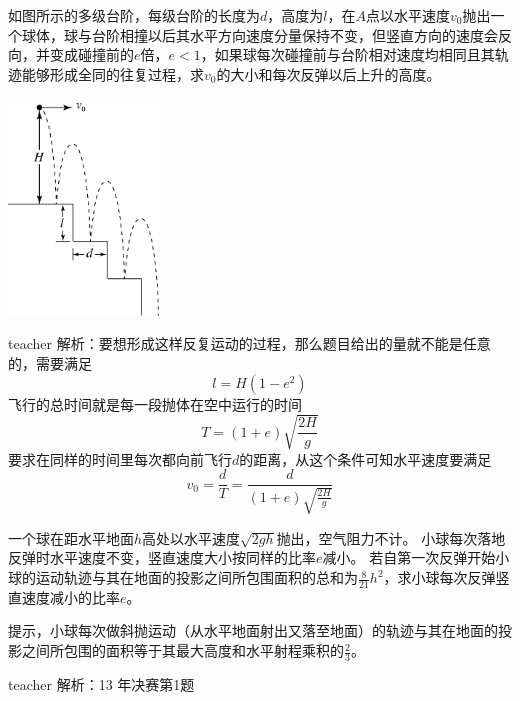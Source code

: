 \begin{example}
如图所示的多级台阶，每级台阶的长度为$d$，高度为$l$，在$A$点以水平速度$v_0$抛出一个球体，球与台阶相撞以后其水平方向速度分量保持不变，但竖直方向的速度会反向，并变成碰撞前的$e$倍，$e<1$，如果球每次碰撞前与台阶相对速度均相同且其轨迹能够形成全同的往复过程，求$v_0$的大小和每次反弹以后上升的高度。
\begin{flushright}
\includegraphics[width=0.3\textwidth]{images/motion-problem-30.pdf}
\end{flushright}
\begin{taggedblock}{teacher}
\noindent
解析：要想形成这样反复运动的过程，那么题目给出的量就不能是任意的，需要满足
\[
l = H(1-e^2)
\]
飞行的总时间就是每一段抛体在空中运行的时间
\[
T = (1+e)\sqrt{\frac{2H}{g}}
\]
要求在同样的时间里每次都向前飞行$d$的距离，从这个条件可知水平速度要满足
\[
v_0 = \frac{d}{T} = \frac{d}{(1+e)\sqrt{\frac{2H}{g}}}
\]
\end{taggedblock}
\end{example}



\begin{example}
一个球在距水平地面$h$高处以水平速度$\sqrt{2gh}$抛出，空气阻力不计。
小球每次落地反弹时水平速度不变，竖直速度大小按同样的比率$e$减小。
若自第一次反弹开始小球的运动轨迹与其在地面的投影之间所包围面积的总和为$\frac{8}{21}h^2$，求小球每次反弹竖直速度减小的比率$e$。

提示，小球每次做斜抛运动（从水平地面射出又落至地面）的轨迹与其在地面的投影之间所包围的面积等于其最大高度和水平射程乘积的$\frac{2}{3}$。
\begin{taggedblock}{teacher}
\newline
解析：13 年决赛第1题
\end{taggedblock}
\end{example}

